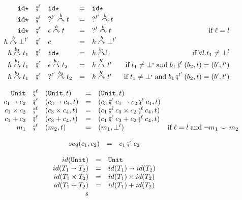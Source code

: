 \documentclass[acmsmall,review,anonymous]{acmart}\settopmatter{printfolios=true,printccs=false,printacmref=false}
\newcommand{\funrule}[3]{#1 &=& #2 & #3\\}
\newcommand{\comprule}[4]{#1 & \fatsemi^\ell & #2 & = & #3 & #4 \\}
\newcommand{\plus}[0]{+}
\newcommand{\hyperCoercionI}[0]{\mathtt{id\star}}
\newcommand{\hyperCoercionC}[3]{#1 \overset{#2}{\curvearrowright} #3}
\newcommand{\POOunit}[0]{\mathtt{Unit}}
\newcommand{\POOfun}[2]{#1 \shortrightarrow #2}
\newcommand{\POOprod}[2]{#1 \times #2}
\newcommand{\POOsum}[2]{#1 \plus #2}
\newcommand{\sidecond}[1]{\text{if}\;#1}
\begin{document}
\begin{figure}
	\[ 
	\begin{array}{rclclr}
	
	\comprule{
		\hyperCoercionI
	}{
		\hyperCoercionI
	}{
		\hyperCoercionI
	}{}
	
	\comprule{
		\hyperCoercionI
	}{
		\hyperCoercionC{?^{l'}}{b}{t}
	}{
		\hyperCoercionC{?^{l'}}{b}{t}
	}{}
	
	\comprule{
		\hyperCoercionI
	}{
		\hyperCoercionC{\epsilon}{b}{t}
	}{
		\hyperCoercionC{?^{l}}{b}{t}
	}{\sidecond{\ell = l}}
	
	\comprule{
		\hyperCoercionC{h}{b}{\bot^{l'}}
	}{
		c
	}{
		\hyperCoercionC{h}{b}{\bot^{l'}}
	}{}
	
	\comprule{
		\hyperCoercionC{h}{b_1}{t_1}
	}{
		\hyperCoercionI
	}{
		\hyperCoercionC{h}{b_1}{!}
	}{
		\sidecond{\forall l. t_1 \neq \bot^{l}}
	}
	
	\comprule{
		\hyperCoercionC{h}{b_1}{t_1}
	}{
		\hyperCoercionC{\epsilon}{b_2}{t_2}
	}{
		\hyperCoercionC{h}{b'}{t'}
	}{
		\sidecond{
			t_1 \neq \bot^{\centerdot} \; \text{and} \;
			b_1 \fatsemi^{\ell} (b_2, t) = (b', t')
		}
	}
	
	\comprule{
		\hyperCoercionC{h}{b_1}{t_1}
	}{
		\hyperCoercionC{?^{l'}}{b_2}{t_2}
	}{
		\hyperCoercionC{h}{b'}{t'}
	}{
		\sidecond{
		t_1 \neq \bot^{\centerdot} \; \text{and} \;
		b_1 \fatsemi^{l'} (b_2, t) = (b', t')
		}
	}
	\end{array}
	\]
	
	\[ 
	\begin{array}{rclclr}
	\comprule{\POOunit}{(\POOunit,t)}{
		(\POOunit,t)
	}{}
	\comprule{\POOfun{c_1}{c_2}}{(\POOfun{c_3}{c_4},t)}{
		(\POOfun{c_3 \fatsemi^{\ell} c_1}{c_2 \fatsemi^\ell c_4},t)
	}{}
	\comprule{\POOprod{c_1}{c_2}}{(\POOprod{c_3}{c_4},t)}{
		(\POOprod{c_1 \fatsemi^\ell c_3}{c_2 \fatsemi^\ell c_4},t)
	}{}
	\comprule{\POOsum{c_1}{c_2}}{(\POOsum{c_3}{c_4},t)}{
		(\POOsum{c_1 \fatsemi^\ell c_3}{c_2 \fatsemi^\ell c_4},t)
	}{}
	\comprule{m_1}{(m_2,t)}{
		(m_1,\bot^l)
	}{
		\sidecond{
		\ell = l \; \text{and} \;
		\neg m_1 \smile m_2 
		}
	}
	\end{array}
	\]
	
	\[
	\begin{array}{rclr}
	\funrule{seq(c_1,c_2)}{
		c_1 \fatsemi^\epsilon c_2
	}{}
	\end{array}
	\]
	
	\[
	\begin{array}{rclr}
	\funrule{id(\POOunit)}{\POOunit}{}
	\funrule{id(\POOfun{T_1}{T_2})}{
		\POOfun{id(T_1)}{id(T_2)}
	}{}
	\funrule{id(\POOprod{T_1}{T_2})}{
		\POOprod{id(T_1)}{id(T_2)}
	}{}
	\funrule{id(\POOsum{T_1}{T_2})}{
		\POOsum{id(T_1)}{id(T_2)}
	}{}s
	\end{array}
	\]
	

\end{figure}
\end{document}
